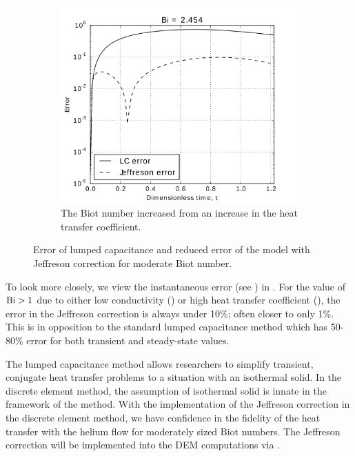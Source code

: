 \begin{figure}
        \begin{subfigure}[b]{0.5\textwidth}
                \includegraphics[width=\textwidth]{figures/LC-JC-analytic-error-Bi-2b}
                \caption{The Biot number increased from  an increase in the heat transfer coefficient.}
				\label{fig:LC-JC-analytic-error-Bi-2b}
        \end{subfigure}
        \caption[Error of lumped capacitance and Jeffreson correction for moderate Biot number]{Error of lumped capacitance and reduced error of the model with Jeffreson correction for moderate Biot number.}\label{fig:LC-JC-analytic-error-Bi-2}
\end{figure}

To look more closely, we view the instantaneous error (see ) in . For the value of $\mathrm{Bi} > 1$ due to either low conductivity () or high heat transfer coefficient (), the error in the Jeffreson correction is always under 10\%; often closer to only 1\%. This is in opposition to the standard lumped capacitance method which has 50-80\% error for both transient and steady-state values.

The lumped capacitance method allows researchers to simplify transient, conjugate heat transfer problems to a situation with an isothermal solid. In the discrete element method, the assumption of isothermal solid is innate in the framework of the method. With the implementation of the Jeffreson correction in the discrete element method, we have confidence in the fidelity of the heat transfer with the helium flow for moderately sized Biot numbers. The Jeffreson correction will be implemented into the DEM computations via . 







